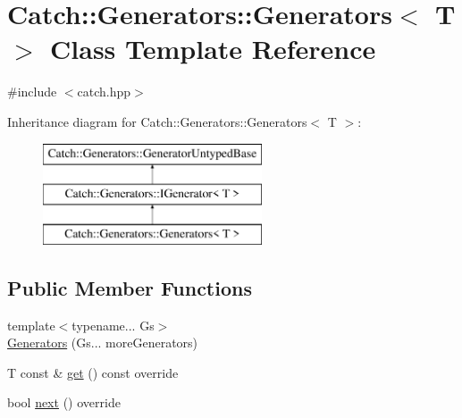 \hypertarget{class_catch_1_1_generators_1_1_generators}{}\section{Catch\+::Generators\+::Generators$<$ T $>$ Class Template Reference}
\label{class_catch_1_1_generators_1_1_generators}


{\ttfamily \#include $<$catch.\+hpp$>$}

Inheritance diagram for Catch\+::Generators\+::Generators$<$ T $>$\+:\begin{figure}[H]
\begin{center}
\leavevmode
\includegraphics[height=3.000000cm]{class_catch_1_1_generators_1_1_generators}
\end{center}
\end{figure}
\subsection*{Public Member Functions}
\begin{DoxyCompactItemize}
\item 
{\footnotesize template$<$typename... Gs$>$ }\\\mbox{\hyperlink{class_catch_1_1_generators_1_1_generators_a0288170b30cd0fdfef6efc2d9bc8acba}{Generators}} (Gs... more\+Generators)
\item 
T const  \& \mbox{\hyperlink{class_catch_1_1_generators_1_1_generators_a66705482b7efa88cae6e6b7062d5de6a}{get}} () const override
\item 
bool \mbox{\hyperlink{class_catch_1_1_generators_1_1_generators_ad127fd2a07347b527f79ab3b78bd40fb}{next}} () override
\end{DoxyCompactItemize}
